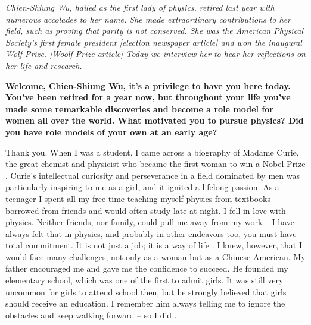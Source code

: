 \documentclass{article}
\date{NOVEMBER 29, 1982}
\begin{document}
\maketitle

\begin{multicols}{2}


\textit{Chien-Shiung Wu, hailed as the first lady of physics, retired last year with numerous accolades to her name. She made extraordinary contributions to her field, such as proving that parity is not conserved. She was the American Physical Society’s first female president [election newspaper article] and won the inaugural Wolf Prize. [Woolf Prize article] Today we interview her to hear her reflections on her life and research.}

\vspace{10pt}

\begin{window}[10,r,\texttt{[image: \{"./images/wu-columbia"]}.png},
\textit{\footnotesize Chien-Shiung Wu in 1963 at Columbia University}
]
\textbf{Welcome, Chien-Shiung Wu, it’s a privilege to have you here today. You’ve been retired for a year now, but throughout your life you’ve made some remarkable discoveries and become a role model for women all over the world. What motivated you to pursue physics? Did you have role models of your own at an early age? }
\vspace{5pt}

Thank you. When I was a student, I came across a biography of Madame Curie, the great chemist and physicist who became the first woman to win a Nobel Prize \cite{L1}. Curie’s intellectual curiosity and perseverance in a field dominated by men was particularly inspiring to me as a girl, and it ignited a lifelong passion. As a teenager I spent all my free time teaching myself physics from textbooks borrowed from friends and would often study late at night. I fell in love with physics. Neither friends, nor family, could pull me away from my work – I have always felt that in physics, and probably in other endeavors too, you must have total commitment. It is not just a job; it is a way of life \cite{L2}. I knew, however, that I would face many challenges, not only as a woman but as a Chinese American. My father encouraged me and gave me the confidence to succeed. He founded my elementary school, which was one of the first to admit girls. It was still very uncommon for girls to attend school then, but he strongly believed that girls should receive an education. I remember him always telling me to ignore the obstacles and keep walking forward – so I did\cite{L3} .
\end{window}


\end{multicols}
\end{document}
